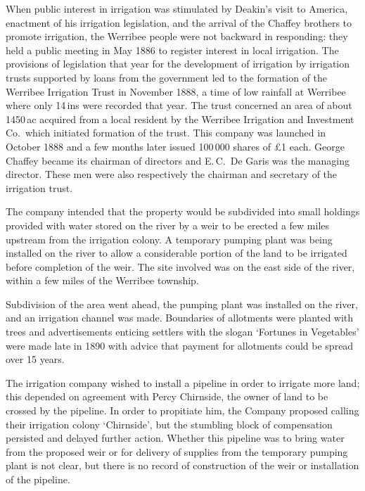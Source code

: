 When public interest in irrigation was stimulated by Deakin's visit to
America, enactment of his irrigation legislation, and the arrival of
the Chaffey brothers to promote irrigation, the Werribee people were
not backward in responding: they held a public meeting in May 1886 to
register interest in local irrigation.  The
provisions of legislation that year for the development of irrigation
by irrigation trusts supported by loans from the government led to the
formation of the Werribee Irrigation Trust in November 1888, a time of
low rainfall at Werribee where only 14\,ins were recorded that
year.  The trust concerned an area of about 1450\,ac
acquired from a local resident by the Werribee Irrigation and
Investment Co.\ which initiated formation of the trust.  This company
was launched in October 1888 and a few months later issued 100\,000
shares of \pounds1 each.  George Chaffey became its chairman of directors
and E.\,C.~De Garis was the managing director.  These men were also
respectively the chairman and secretary of the irrigation
trust.

The company intended that the property would be subdivided into small
holdings provided with water stored on the river by a weir to be
erected a few miles upstream from the irrigation colony.  A temporary
pumping plant was being installed on the river to allow a considerable
portion of the land to be irrigated before completion of the
weir.  The site involved was on
the east side of the river, within a few miles of the Werribee
township.

Subdivision of the area went ahead, the pumping plant was installed on
the river, and an irrigation channel was made.  Boundaries of
allotments were planted with trees and advertisements enticing
settlers with the slogan `Fortunes in Vegetables' were made late in
1890 with advice that payment for allotments could be spread over 15
years.

The irrigation company wished to install a pipeline in order to
irrigate more land; this depended on agreement with Percy Chirnside,
the owner of land to be crossed by the pipeline.  In order to
propitiate him, the Company proposed calling their irrigation colony
`Chirnside', but the stumbling block of compensation persisted and
delayed further action.  Whether this
pipeline was to bring water from the proposed weir or for delivery of
supplies from the temporary pumping plant is not clear, but there is
no record of construction of the weir or installation of the pipeline.

